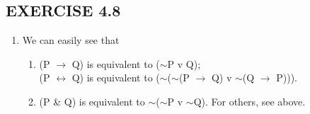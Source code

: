 \documentclass[a4paper,12pt]{article}
\newcommand{\mra}{$\rightarrow$ }
\newcommand{\mlra}{$\leftrightarrow$ }
\newcommand{\ms}{$\sim$}
\begin{document}
    \subsection*{EXERCISE 4.8}

    \begin{enumerate}[label=\arabic*,leftmargin=*]

        \item We can easily see that
            \begin{enumerate}[label=(\roman*)]
                \item (P \mra Q) is equivalent to (\ms P v Q);\\
                    (P \mlra Q) is equivalent to (\ms (\ms (P \mra Q) v \ms (Q \mra P))).
                \item (P \& Q) is equivalent to \ms (\ms P v \ms Q). For others, see above.
            \end{enumerate}


\end{enumerate}
\end{document}
